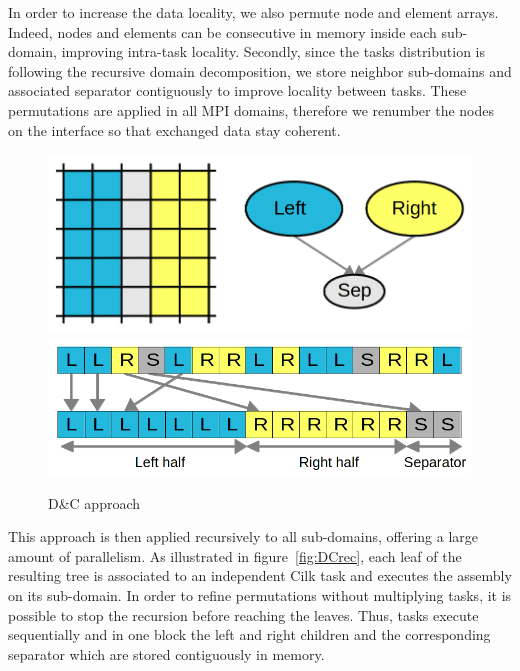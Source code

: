 \documentclass{IOS-Book-Article}
\begin{document}
In order to increase the data locality, we also permute node and element arrays.
Indeed, nodes and elements can be consecutive in memory inside each sub-domain, improving intra-task locality.
Secondly, since the tasks distribution is following the recursive domain decomposition, we store neighbor sub-domains and associated separator contiguously to improve locality between tasks.
These permutations are applied in all MPI domains, therefore we renumber the nodes on the interface so that exchanged data stay coherent.
\begin{figure}[htp]
 \centering
 \includegraphics[scale=0.17]{DC_approach.png}
 \includegraphics[scale=0.21]{Data_permutations.png}
 \caption{D\&C approach}
 \label{fig:DCapp}
\end{figure}

This approach is then applied recursively to all sub-domains, offering a large amount of parallelism.
As illustrated in figure~\ref{fig:DCrec}, each leaf of the resulting tree is associated to an independent Cilk task and executes the assembly on its sub-domain.
In order to refine permutations without multiplying tasks, it is possible to stop the recursion before reaching the leaves.
Thus, tasks execute sequentially and in one block the left and right children and the corresponding separator which are stored contiguously in memory.
\end{document}
